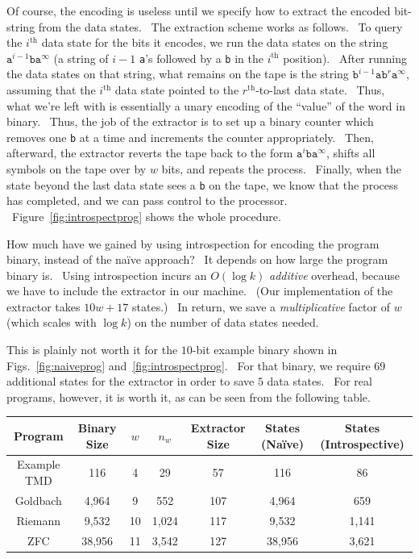 \documentclass[11pt]{article}
\begin{document}
Of course, the encoding is useless until we specify how to extract the encoded bit-string from the data states. \ The extraction scheme works as follows. \ To query the $i^\textrm{th}$ data state for the bits it encodes, we run the data states on the string $\texttt{a}^{i-1}\texttt{b}\texttt{a}^{\infty}$ (a string of $i-1$ \texttt{a}'s followed by a \texttt{b} in the $i^\textrm{th}$ position). \ After running the data states on that string, what remains on the tape is the string $\texttt{b}^{i-1}\texttt{a}\texttt{b}^r\texttt{a}^{\infty}$, assuming that the $i^\textrm{th}$ data state pointed to the $r^\textrm{th}$-to-last data state. \ Thus, what we're left with is essentially a unary encoding of the ``value'' of the word in binary. \ Thus, the job of the extractor is to set up a binary counter which removes one \texttt{b} at a time and increments the counter appropriately. \ Then, afterward, the extractor reverts the tape back to the form $\texttt{a}^i\texttt{b}\texttt{a}^{\infty}$, shifts all symbols on the tape over by $w$ bits, and repeats the process. \ Finally, when the state beyond the last data state sees a \texttt{b} on the tape, we know that the process has completed, and we can pass control to the processor. \ Figure~\ref{fig:introspectprog} shows the whole procedure.

How much have we gained by using introspection for encoding the program binary, instead of the na\"ive approach? \ It depends on how large the program binary is. \ Using introspection incurs an $O(\log k)$ \emph{additive} overhead, because we have to include the extractor in our machine. \ (Our implementation of the extractor takes $10w + 17$ states.) \ In return, we save a \emph{multiplicative} factor of $w$ (which scales with $\log k$) on the number of data states needed.

This is plainly not worth it for the $10$-bit example binary shown in Figs.~\ref{fig:naiveprog} and~\ref{fig:introspectprog}. \ For that binary, we require $69$ additional states for the extractor in order to save $5$ data states. \ For real programs, however, it is worth it, as can be seen from the following table.

\begin{center}
    \begin{tabular}{||c c c c c c c||}
    \hline
    Program & Binary Size & $w$ & $n_w$ & Extractor Size & States (Na\"ive) & States (Introspective) \\ [0.5ex]
    \hline\hline
    Example TMD & 116 & 4 & 29 & 57 & 116 & 86 \\
    \hline
    Goldbach & 4,964 & 9 & 552 & 107 & 4,964 & 659 \\
    \hline
    Riemann & 9,532 & 10 & 1,024 & 117 & 9,532 & 1,141 \\
    \hline
    ZFC & 38,956 & 11 & 3,542 & 127 & 38,956 & 3,621 \\
    \hline
    \end{tabular}
\end{center}
\end{document}
